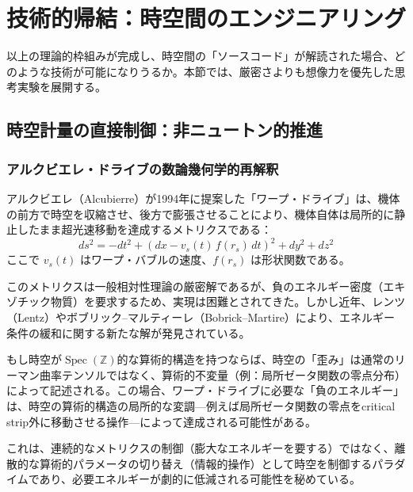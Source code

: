 \documentclass[12pt,a4paper]{ltjsarticle}
\theoremstyle{definition}
\newcommand{\Spec}{\operatorname{Spec}}
\begin{document}
\newpage
\section{技術的帰結：時空間のエンジニアリング}
\label{sec:technology}

以上の理論的枠組みが完成し、時空間の「ソースコード」が解読された場合、どのような技術が可能になりうるか。本節では、厳密さよりも想像力を優先した思考実験を展開する。

\subsection{時空計量の直接制御：非ニュートン的推進}

\subsubsection{アルクビエレ・ドライブの数論幾何学的再解釈}

アルクビエレ（Alcubierre）が1994年に提案した「ワープ・ドライブ」\cite{Alcubierre1994}は、機体の前方で時空を収縮させ、後方で膨張させることにより、機体自体は局所的に静止したまま超光速移動を達成するメトリクスである：
\begin{equation}
  ds^2 = -dt^2 + (dx - v_s(t)\, f(r_s)\, dt)^2 + dy^2 + dz^2
\end{equation}
ここで $v_s(t)$ はワープ・バブルの速度、$f(r_s)$ は形状関数である。

このメトリクスは一般相対性理論の厳密解であるが、負のエネルギー密度（エキゾチック物質）を要求するため、実現は困難とされてきた\cite{Pfenning1997}。しかし近年、レンツ（Lentz）\cite{Lentz2021}やボブリック--マルティーレ（Bobrick--Martire）\cite{BobrickMartire2021}により、エネルギー条件の緩和に関する新たな解が発見されている。

\begin{techbox}
もし時空が$\Spec(\mathbb{Z})$的な算術的構造を持つならば、時空の「歪み」は通常のリーマン曲率テンソルではなく、算術的不変量（例：局所ゼータ関数の零点分布）によって記述される。この場合、ワープ・ドライブに必要な「負のエネルギー」は、時空の算術的構造の局所的な変調---例えば局所ゼータ関数の零点をcritical strip外に移動させる操作---によって達成される可能性がある。

これは、連続的なメトリクスの制御（膨大なエネルギーを要する）ではなく、離散的な算術的パラメータの切り替え（情報的操作）として時空を制御するパラダイムであり、必要エネルギーが劇的に低減される可能性を秘めている。
\end{techbox}
\end{document}
